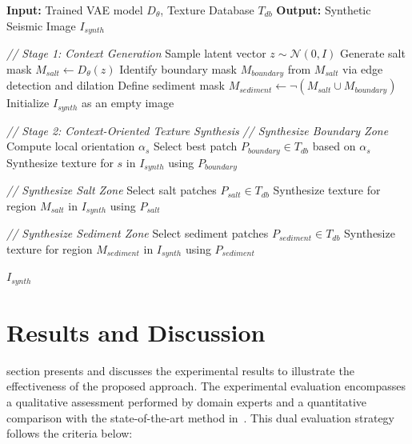 \documentclass{ieeeaccess}
\begin{document}
\begin{algorithm}[htbp]
\caption{Context-Oriented Seismic Image Synthesis}
\label{alg:synthesis}
\begin{algorithmic}[1]
\State \textbf{Input:} Trained VAE model $D_\theta$, Texture Database $T_{db}$
\State \textbf{Output:} Synthetic Seismic Image $I_{synth}$

\vspace{0.2cm}
\Statex \textit{// Stage 1: Context Generation}
\State Sample latent vector $z \sim \mathcal{N}(0, I)$
\State Generate salt mask $M_{salt} \leftarrow D_\theta(z)$
\State Identify boundary mask $M_{boundary}$ from $M_{salt}$ via edge detection and dilation
\State Define sediment mask $M_{sediment} \leftarrow \neg(M_{salt} \cup M_{boundary})$
\State Initialize $I_{synth}$ as an empty image

\vspace{0.2cm}
\Statex \textit{// Stage 2: Context-Oriented Texture Synthesis}
\State \textit{// Synthesize Boundary Zone}
    \State Compute local orientation $\alpha_s$
    \State Select best patch $P_{boundary} \in T_{db}$ based on $\alpha_s$
    \State Synthesize texture for $s$ in $I_{synth}$ using $P_{boundary}$
\EndFor

\State \textit{// Synthesize Salt Zone}
\State Select salt patches $P_{salt} \in T_{db}$
\State Synthesize texture for region $M_{salt}$ in $I_{synth}$ using $P_{salt}$

\State \textit{// Synthesize Sediment Zone}
\State Select sediment patches $P_{sediment} \in T_{db}$
\State Synthesize texture for region $M_{sediment}$ in $I_{synth}$ using $P_{sediment}$

\vspace{0.2cm}
\State \Return $I_{synth}$
\end{algorithmic}
\end{algorithm}

\section{Results and Discussion}
\label{sec:results}

 section presents and discusses the experimental results to illustrate the effectiveness of the proposed approach. The experimental evaluation encompasses a qualitative assessment performed by domain experts and a quantitative comparison with the state-of-the-art method in~\cite{Ferreira2020}. This dual evaluation strategy follows the criteria below:
\end{document}
